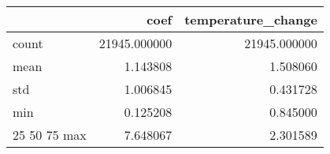 \begin{tabular}{lrr}
\toprule
 & coef & temperature_change \\
\midrule
count & 21945.000000 & 21945.000000 \\
mean & 1.143808 & 1.508060 \\
std & 1.006845 & 0.431728 \\
min & 0.125208 & 0.845000 \\
25%
50%
75%
max & 7.648067 & 2.301589 \\
\bottomrule
\end{tabular}
